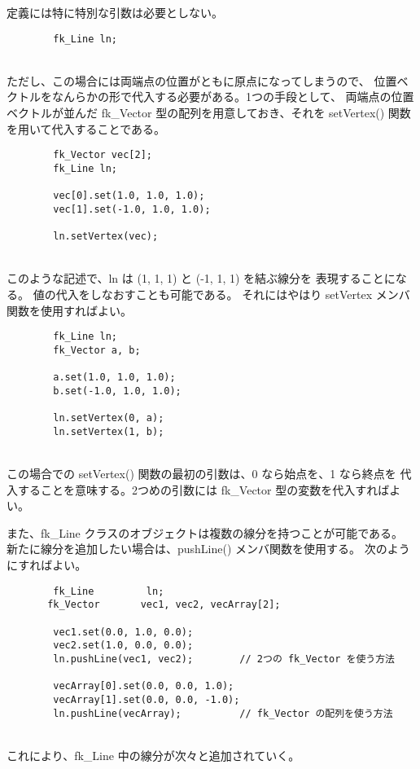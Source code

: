 定義には特に特別な引数は必要としない。
\\
\begin{screen}
\begin{verbatim}
        fk_Line ln;
\end{verbatim}
\end{screen}
~ \\
ただし、この場合には両端点の位置がともに原点になってしまうので、
位置ベクトルをなんらかの形で代入する必要がある。1つの手段として、
両端点の位置ベクトルが並んだ fk\_Vector 型の配列を用意しておき、それを
setVertex() 関数を用いて代入することである。
\\
\begin{breakbox}
\begin{verbatim}
        fk_Vector vec[2];
        fk_Line ln;

        vec[0].set(1.0, 1.0, 1.0);
        vec[1].set(-1.0, 1.0, 1.0);

        ln.setVertex(vec);
\end{verbatim}
\end{breakbox}
~ \\
このような記述で、ln は (1, 1, 1) と (-1, 1, 1) を結ぶ線分を
表現することになる。
値の代入をしなおすことも可能である。
それにはやはり setVertex メンバ関数を使用すればよい。
\\
\begin{breakbox}
\begin{verbatim}
        fk_Line ln;
        fk_Vector a, b;

        a.set(1.0, 1.0, 1.0);
        b.set(-1.0, 1.0, 1.0);

        ln.setVertex(0, a);
        ln.setVertex(1, b);
\end{verbatim}
\end{breakbox}
~ \\
この場合での setVertex() 関数の最初の引数は、0 なら始点を、1 なら終点を
代入することを意味する。2つめの引数には fk\_Vector 型の変数を代入すればよい。

また、fk\_Line クラスのオブジェクトは複数の線分を持つことが可能である。
新たに線分を追加したい場合は、pushLine() メンバ関数を使用する。
次のようにすればよい。
\\
\begin{breakbox}
\begin{verbatim}
        fk_Line         ln;
       fk_Vector       vec1, vec2, vecArray[2];

        vec1.set(0.0, 1.0, 0.0);
        vec2.set(1.0, 0.0, 0.0);
        ln.pushLine(vec1, vec2);        // 2つの fk_Vector を使う方法

        vecArray[0].set(0.0, 0.0, 1.0);
        vecArray[1].set(0.0, 0.0, -1.0);
        ln.pushLine(vecArray);          // fk_Vector の配列を使う方法
\end{verbatim}
\end{breakbox}
~ \\
これにより、fk\_Line 中の線分が次々と追加されていく。


